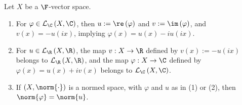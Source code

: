 \documentclass[10pt]{mypackage}
\begin{document}
  \begin{proposition}
    Let $X$ be a $\F$-vector space.
    \begin{enumerate}[(1)]
      \item For $\varphi\in \mathcal{L}_{\C}\left(X,\C\right)$, then $u := \re\left(\varphi\right)$ and $v := \im\left(\varphi\right)$, and $v(x) = -u\left(ix\right)$, implying $\varphi(x) = u(x) - iu\left(ix\right)$.
      \item For $u\in \mathcal{L}_{\R}\left(X,\R\right)$, the map $v: X\rightarrow \R$ defined by $v(x) := -u\left(ix\right)$ belongs to $\mathcal{L}_{\R}\left(X,\R\right)$, and the map $\varphi: X\rightarrow \C$ defined by $\varphi(x) = u(x) + iv(x)$ belongs to $\mathcal{L}_{\C}\left(X,\C\right)$.
      \item If $\left(X,\norm{\cdot}\right)$ is a normed space, with $\varphi$ and $u$ as in (1) or (2), then $\norm{\varphi} = \norm{u}$.
    \end{enumerate}
  \end{proposition}
\end{document}

